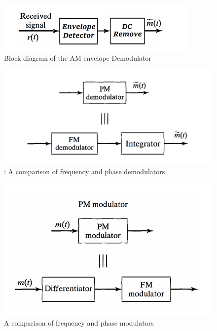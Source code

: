 \documentclass[11pt]{article}
\begin{document}
\begin{question}
\begin{subquestion}
\begin{figure}[H]
\centering
\includegraphics[scale=1]{Fig/4.png}
\caption{Block diagram of the AM envelope Demodulator}
\end{figure}

\begin{figure}[H]
\centering
\includegraphics[scale=1]{Fig/5.png}
\caption{: A comparison of frequency and phase demodulators}
\end{figure}

\begin{figure}[H]
\centering
\includegraphics[scale=1]{Fig/6.png}
\caption{ A comparison of frequency and phase modulators}
\end{figure}

\end{subquestion}


\end{question}
\end{document}
